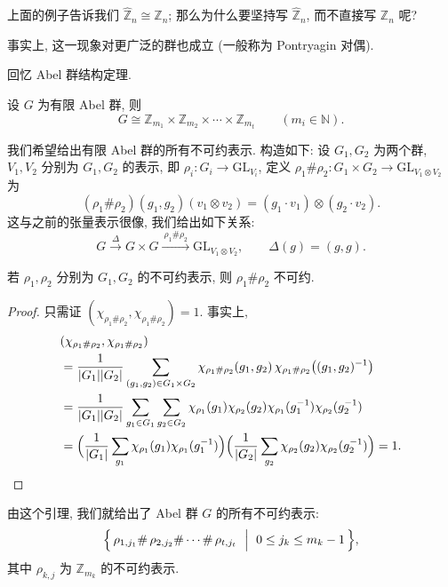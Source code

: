 \begin{remark}\label{rem:dual-group-Zn}
上面的例子告诉我们 $\widehat{\mathbb{Z}}_n\cong\mathbb{Z}_n$; 那么为什么要坚持写
$\widehat{\mathbb{Z}}_n$, 而不直接写 $\mathbb{Z}_n$ 呢?
\end{remark}

事实上, 这一现象对更广泛的群也成立 (一般称为 Pontryagin 对偶).

回忆 Abel 群结构定理.

\begin{theorem}\label{thm:abelian-structure}
设 $G$ 为有限 Abel 群, 则
\[
  G\cong\mathbb{Z}_{m_1}\times\mathbb{Z}_{m_2}\times\cdots\times\mathbb{Z}_{m_t}
  \qquad(m_i\in\mathbb{N}).
\]
\end{theorem}

我们希望给出有限 Abel 群的所有不可约表示. 构造如下: 设 $G_1,G_2$ 为两个群,
$V_1,V_2$ 分别为 $G_1,G_2$ 的表示, 即 $\rho_i\colon G_i\to\mathrm{GL}_{V_i}$,
定义 $\rho_1\#\rho_2\colon G_1\times G_2\to\mathrm{GL}_{V_1\otimes V_2}$ 为
\[
  (\rho_1\#\rho_2)(g_1,g_2)(v_1\otimes v_2)=(g_1\cdot v_1)\otimes(g_2\cdot v_2).
\]
这与之前的张量表示很像, 我们给出如下关系:
\[
  G\xrightarrow{\ \Delta\ }G\times G\xrightarrow{\ \rho_1\#\rho_2\ }
  \mathrm{GL}_{V_1\otimes V_2},\qquad \Delta(g)=(g,g).
\]

\begin{lemma}\label{lem:tensor-of-irreducibles}
若 $\rho_1,\rho_2$ 分别为 $G_1,G_2$ 的不可约表示, 则 $\rho_1\#\rho_2$ 不可约.
\end{lemma}

\begin{proof}
只需证 $(\chi_{\rho_1\#\rho_2},\chi_{\rho_1\#\rho_2})=1$. 事实上,
\[\begin{aligned}
  &(\chi_{\rho_1\#\rho_2},\chi_{\rho_1\#\rho_2})\\
  &=\frac{1}{|G_1||G_2|}\sum_{(g_1,g_2)\in G_1\times G_2}
   \chi_{\rho_1\#\rho_2}(g_1,g_2)\,\chi_{\rho_1\#\rho_2}\bigl((g_1,g_2)^{-1}\bigr)\\
  &=\frac{1}{|G_1||G_2|}\sum_{g_1\in G_1}\sum_{g_2\in G_2}
   \chi_{\rho_1}(g_1)\chi_{\rho_2}(g_2)\chi_{\rho_1}(g_1^{-1})\chi_{\rho_2}(g_2^{-1})\\
  &=\Bigl(\frac{1}{|G_1|}\sum_{g_1}\chi_{\rho_1}(g_1)\chi_{\rho_1}(g_1^{-1})\Bigr)
   \Bigl(\frac{1}{|G_2|}\sum_{g_2}\chi_{\rho_2}(g_2)\chi_{\rho_2}(g_2^{-1})\Bigr)=1 .
\end{aligned}\]
\end{proof}

由这个引理, 我们就给出了 Abel 群 $G$ 的所有不可约表示:
\[
  \Bigl\{\,\rho_{1,j_1}\#\,\rho_{2,j_2}\#\cdots\#\,\rho_{t,j_t}
  \ \Bigm|\ 0\le j_k\le m_k-1\,\Bigr\},
\]
其中 $\rho_{k,j}$ 为 $\mathbb{Z}_{m_k}$ 的不可约表示.

